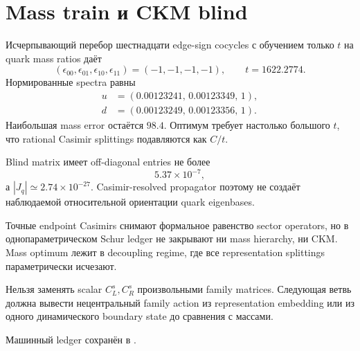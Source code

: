 \section{Mass train и CKM blind}

Исчерпывающий перебор шестнадцати edge-sign cocycles с обучением только \(t\)
на quark mass ratios даёт
\begin{equation}
 (\epsilon_{00},\epsilon_{01},\epsilon_{10},\epsilon_{11})
 =(-1,-1,-1,-1),
 \qquad t=1622.2774.
\end{equation}
Нормированные spectra равны
\begin{align}
 u&=(0.00123241,\,0.00123349,\,1),\\
 d&=(0.00123249,\,0.00123356,\,1).
\end{align}
Наибольшая mass error остаётся \(98.4\). Оптимум требует настолько большого
\(t\), что rational Casimir splittings подавляются как \(C/t\).

Blind matrix имеет off-diagonal entries не более
\begin{equation}
 5.37\times10^{-7},
\end{equation}
а \(|J_q|\simeq2.74\times10^{-27}\). Casimir-resolved propagator поэтому не
создаёт наблюдаемой относительной ориентации quark eigenbases.

\begin{theorem}
Точные endpoint Casimirs снимают формальное равенство sector operators, но в
однопараметрическом Schur ledger не закрывают ни mass hierarchy, ни CKM.
Mass optimum лежит в decoupling regime, где все representation splittings
параметрически исчезают.
\end{theorem}

\begin{nogocriterion}
Нельзя заменять scalar \(C_L^s,C_R^s\) произвольными family matrices. Следующая
ветвь должна вывести нецентральный family action из representation embedding
или из одного динамического boundary state до сравнения с массами.
\end{nogocriterion}

Машинный ledger сохранён в
.